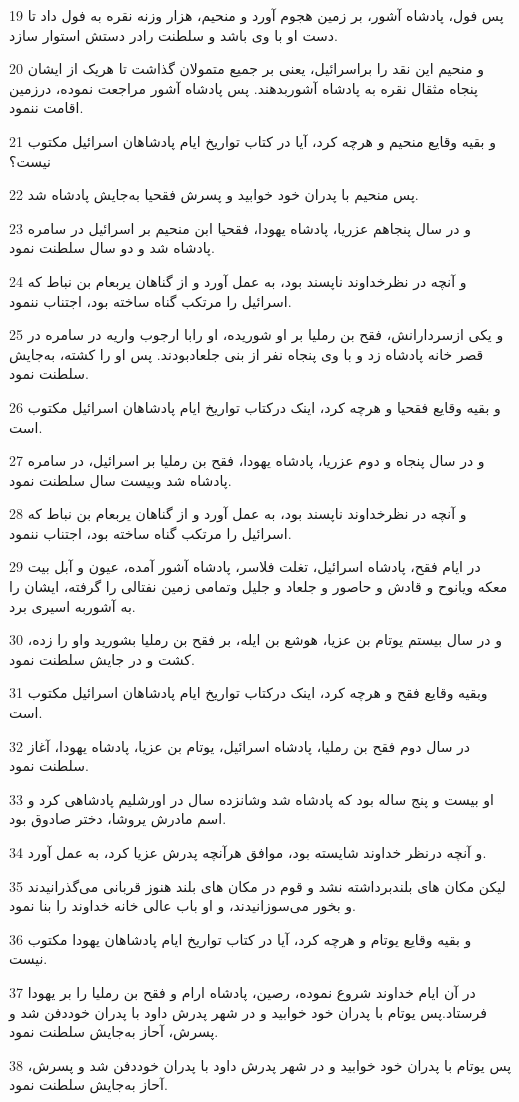 \par 19 پس فول، پادشاه آشور، بر زمین هجوم آورد و منحیم، هزار وزنه نقره به فول داد تا دست او با وی باشد و سلطنت رادر دستش استوار سازد.
\par 20 و منحیم این نقد را براسرائیل، یعنی بر جمیع متمولان گذاشت تا هریک از ایشان پنجاه مثقال نقره به پادشاه آشوربدهند. پس پادشاه آشور مراجعت نموده، درزمین اقامت ننمود.
\par 21 و بقیه وقایع منحیم و هرچه کرد، آیا در کتاب تواریخ ایام پادشاهان اسرائیل مکتوب نیست؟
\par 22 پس منحیم با پدران خود خوابید و پسرش فقحیا به‌جایش پادشاه شد.
\par 23 و در سال پنجاهم عزریا، پادشاه یهودا، فقحیا ابن منحیم بر اسرائیل در سامره پادشاه شد و دو سال سلطنت نمود.
\par 24 و آنچه در نظرخداوند ناپسند بود، به عمل آورد و از گناهان یربعام بن نباط که اسرائیل را مرتکب گناه ساخته بود، اجتناب ننمود.
\par 25 و یکی ازسردارانش، فقح بن رملیا بر او شوریده، او رابا ارجوب واریه در سامره در قصر خانه پادشاه زد و با وی پنجاه نفر از بنی جلعادبودند. پس او را کشته، به‌جایش سلطنت نمود.
\par 26 و بقیه وقایع فقحیا و هر‌چه کرد، اینک درکتاب تواریخ ایام پادشاهان اسرائیل مکتوب است.
\par 27 و در سال پنجاه و دوم عزریا، پادشاه یهودا، فقح بن رملیا بر اسرائیل، در سامره پادشاه شد وبیست سال سلطنت نمود.
\par 28 و آنچه در نظرخداوند ناپسند بود، به عمل آورد و از گناهان یربعام بن نباط که اسرائیل را مرتکب گناه ساخته بود، اجتناب ننمود.
\par 29 در ایام فقح، پادشاه اسرائیل، تغلت فلاسر، پادشاه آشور آمده، عیون و آبل بیت معکه ویانوح و قادش و حاصور و جلعاد و جلیل وتمامی زمین نفتالی را گرفته، ایشان را به آشوربه اسیری برد.
\par 30 و در سال بیستم یوتام بن عزیا، هوشع بن ایله، بر فقح بن رملیا بشورید واو را زده، کشت و در جایش سلطنت نمود.
\par 31 وبقیه وقایع فقح و هر‌چه کرد، اینک درکتاب تواریخ ایام پادشاهان اسرائیل مکتوب است.
\par 32 در سال دوم فقح بن رملیا، پادشاه اسرائیل، یوتام بن عزیا، پادشاه یهودا، آغاز سلطنت نمود.
\par 33 او بیست و پنج ساله بود که پادشاه شد وشانزده سال در اورشلیم پادشاهی کرد و اسم مادرش یروشا، دختر صادوق بود.
\par 34 و آنچه درنظر خداوند شایسته بود، موافق هر‌آنچه پدرش عزیا کرد، به عمل آورد.
\par 35 لیکن مکان های بلندبرداشته نشد و قوم در مکان های بلند هنوز قربانی می‌گذرانیدند و بخور می‌سوزانیدند، و او باب عالی خانه خداوند را بنا نمود.
\par 36 و بقیه وقایع یوتام و هر‌چه کرد، آیا در کتاب تواریخ ایام پادشاهان یهودا مکتوب نیست.
\par 37 در آن ایام خداوند شروع نموده، رصین، پادشاه ارام و فقح بن رملیا را بر یهودا فرستاد.پس یوتام با پدران خود خوابید و در شهر پدرش داود با پدران خوددفن شد و پسرش، آحاز به‌جایش سلطنت نمود.
\par 38 پس یوتام با پدران خود خوابید و در شهر پدرش داود با پدران خوددفن شد و پسرش، آحاز به‌جایش سلطنت نمود.
 
